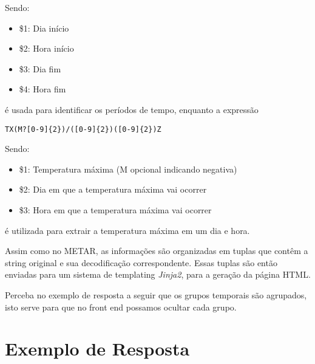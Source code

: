 Sendo:
\begin{itemize}
\item \$1: Dia início
\item \$2: Hora início
\item \$3: Dia fim
\item \$4: Hora fim
\end{itemize}

é usada para identificar os períodos de tempo, enquanto a expressão

\begin{verbatim}
TX(M?[0-9]{2})/([0-9]{2})([0-9]{2})Z
\end{verbatim}

Sendo:
\begin{itemize}
\item \$1: Temperatura máxima (M opcional indicando negativa)
\item \$2: Dia em que a temperatura máxima vai ocorrer
\item \$3: Hora em que a temperatura máxima vai ocorrer
\end{itemize}

é utilizada para extrair a temperatura máxima em um dia e hora.

Assim como no METAR, as informações são organizadas em tuplas que contêm a string original
e sua decodificação correspondente. Essas tuplas são então enviadas para um sistema de
templating \textit{Jinja2}, para a geração da página HTML.

Perceba no exemplo de resposta a seguir que os grupos temporais são agrupados,
isto serve para que no front end possamos ocultar cada grupo.

\section{Exemplo de Resposta}


